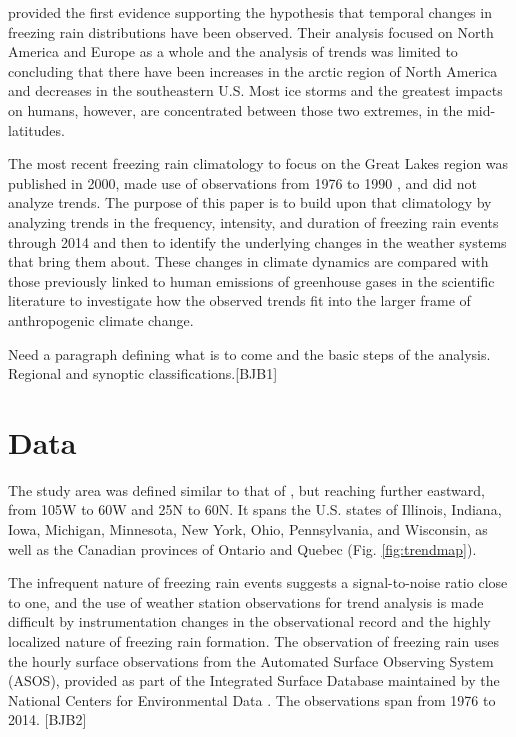 \documentclass[twocol]{ametsoc}
\begin{document}
\citet{groisman2016recent} provided the first evidence supporting the hypothesis that temporal changes in freezing rain distributions have been observed. Their analysis focused on North America and Europe as a whole and the analysis of trends was limited to concluding that there have been increases in the arctic region of North America and decreases in the southeastern U.S. Most ice storms and the greatest impacts on humans, however, are concentrated between those two extremes, in the mid-latitudes.

The most recent freezing rain climatology to focus on the Great Lakes region was published in 2000, made use of observations from 1976 to 1990 \citep{cortinas2000climatology}, and did not analyze trends. The purpose of this paper is to build upon that climatology by analyzing trends in the frequency, intensity, and duration of freezing rain events through 2014 and then to identify the underlying changes in the weather systems that bring them about. These changes in climate dynamics are compared with those previously linked to human emissions of greenhouse gases in the scientific literature to investigate how the observed trends fit into the larger frame of anthropogenic climate change.

Need a paragraph defining what is to come and the basic steps of the analysis.  Regional and synoptic classifications.[BJB1]


\section{Data}
The study area was defined similar to that of \citet{cortinas2000climatology}, but reaching further eastward, from 105\degree W to 60\degree W and 25\degree N to 60\degree N. It spans the U.S. states of Illinois, Indiana, Iowa, Michigan, Minnesota, New York, Ohio, Pennsylvania, and Wisconsin, as well as the Canadian provinces of Ontario and Quebec (Fig. \ref{fig:trendmap}).

The infrequent nature of freezing rain events suggests a signal-to-noise ratio close to one, and the use of weather station observations for trend analysis is made difficult by instrumentation changes in the observational record and the highly localized nature of freezing rain formation.  The observation of freezing rain uses the hourly surface observations from the Automated Surface Observing System (ASOS), provided as part of the Integrated Surface Database maintained by the National Centers for Environmental Data \citep{smith2011integrated}. The observations span from 1976 to 2014. [BJB2]
\end{document}
